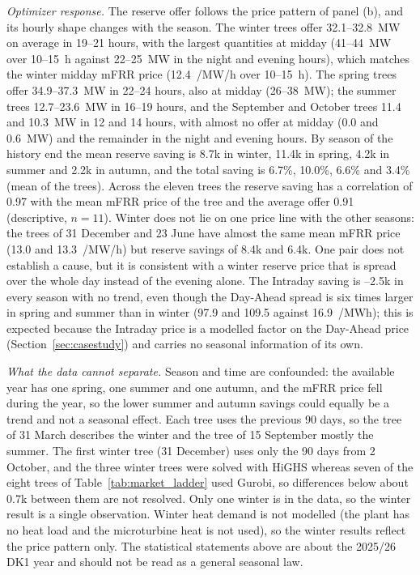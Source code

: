 \documentclass[journal]{IEEEtran}
\begin{document}
\textit{Optimizer response.} The reserve offer follows the price pattern of panel (b), and its hourly shape changes with the season. The winter trees offer 32.1--32.8~MW on average in 19--21 hours, with the largest quantities at midday (41--44~MW over 10--15~h against 22--25~MW in the night and evening hours), which matches the winter midday mFRR price (12.4~\texteuro/MW/h over 10--15~h). The spring trees offer 34.9--37.3~MW in 22--24 hours, also at midday (26--38~MW); the summer trees 12.7--23.6~MW in 16--19 hours, and the September and October trees 11.4 and 10.3~MW in 12 and 14 hours, with almost no offer at midday (0.0 and 0.6~MW) and the remainder in the night and evening hours. By season of the history end the mean reserve saving is \texteuro 8.7k in winter, \texteuro 11.4k in spring, \texteuro 4.2k in summer and \texteuro 2.2k in autumn, and the total saving is 6.7\%, 10.0\%, 6.6\% and 3.4\% (mean of the trees). Across the eleven trees the reserve saving has a correlation of 0.97 with the mean mFRR price of the tree and the average offer 0.91 (descriptive, $n=11$). Winter does not lie on one price line with the other seasons: the trees of 31 December and 23 June have almost the same mean mFRR price (13.0 and 13.3~\texteuro/MW/h) but reserve savings of \texteuro 8.4k and \texteuro 6.4k. One pair does not establish a cause, but it is consistent with a winter reserve price that is spread over the whole day instead of the evening alone. The Intraday saving is --2.5k in every season with no trend, even though the Day-Ahead spread is six times larger in spring and summer than in winter (97.9 and 109.5 against 16.9~\texteuro/MWh); this is expected because the Intraday price is a modelled factor on the Day-Ahead price (Section~\ref{sec:casestudy}) and carries no seasonal information of its own.

\textit{What the data cannot separate.} Season and time are confounded: the available year has one spring, one summer and one autumn, and the mFRR price fell during the year, so the lower summer and autumn savings could equally be a trend and not a seasonal effect. Each tree uses the previous 90 days, so the tree of 31 March describes the winter and the tree of 15 September mostly the summer. The first winter tree (31 December) uses only the 90 days from 2 October, and the three winter trees were solved with HiGHS whereas seven of the eight trees of Table~\ref{tab:market_ladder} used Gurobi, so differences below about \texteuro 0.7k between them are not resolved. Only one winter is in the data, so the winter result is a single observation. Winter heat demand is not modelled (the plant has no heat load and the microturbine heat is not used), so the winter results reflect the price pattern only. The statistical statements above are about the 2025/26 DK1 year and should not be read as a general seasonal law.
\end{document}
